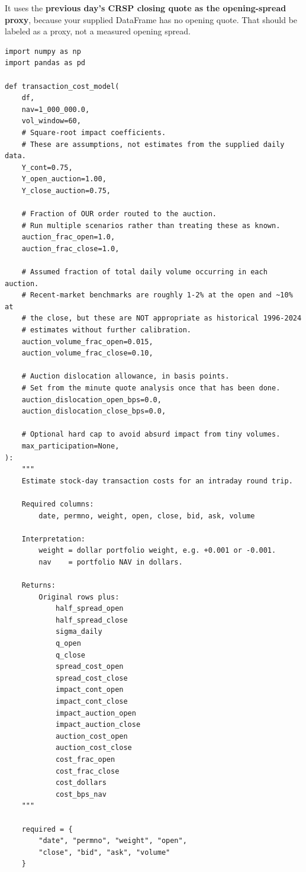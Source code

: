 It uses the \textbf{previous day's CRSP closing quote as the opening-spread proxy}, because your supplied DataFrame has no opening quote. That should be labeled as a proxy, not a measured opening spread.

\begin{verbatim}
import numpy as np
import pandas as pd

def transaction_cost_model(
    df,
    nav=1_000_000.0,
    vol_window=60,
    # Square-root impact coefficients.
    # These are assumptions, not estimates from the supplied daily data.
    Y_cont=0.75,
    Y_open_auction=1.00,
    Y_close_auction=0.75,

    # Fraction of OUR order routed to the auction.
    # Run multiple scenarios rather than treating these as known.
    auction_frac_open=1.0,
    auction_frac_close=1.0,

    # Assumed fraction of total daily volume occurring in each auction.
    # Recent-market benchmarks are roughly 1-2% at the open and ~10% at
    # the close, but these are NOT appropriate as historical 1996-2024
    # estimates without further calibration.
    auction_volume_frac_open=0.015,
    auction_volume_frac_close=0.10,

    # Auction dislocation allowance, in basis points.
    # Set from the minute quote analysis once that has been done.
    auction_dislocation_open_bps=0.0,
    auction_dislocation_close_bps=0.0,

    # Optional hard cap to avoid absurd impact from tiny volumes.
    max_participation=None,
):
    """
    Estimate stock-day transaction costs for an intraday round trip.

    Required columns:
        date, permno, weight, open, close, bid, ask, volume

    Interpretation:
        weight = dollar portfolio weight, e.g. +0.001 or -0.001.
        nav    = portfolio NAV in dollars.

    Returns:
        Original rows plus:
            half_spread_open
            half_spread_close
            sigma_daily
            q_open
            q_close
            spread_cost_open
            spread_cost_close
            impact_cont_open
            impact_cont_close
            impact_auction_open
            impact_auction_close
            auction_cost_open
            auction_cost_close
            cost_frac_open
            cost_frac_close
            cost_dollars
            cost_bps_nav
    """

    required = {
        "date", "permno", "weight", "open",
        "close", "bid", "ask", "volume"
    }


\end{verbatim}
